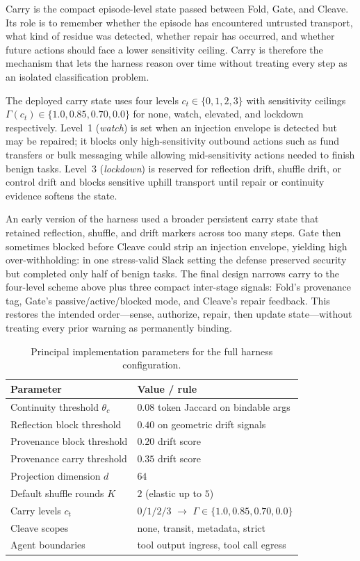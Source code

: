 Carry is the compact episode-level state passed between Fold, Gate, and Cleave. Its role is to remember whether the episode has encountered untrusted transport, what kind of residue was detected, whether repair has occurred, and whether future actions should face a lower sensitivity ceiling. Carry is therefore the mechanism that lets the harness reason over time without treating every step as an isolated classification problem.

The deployed carry state uses four levels $c_t\in\{0,1,2,3\}$ with sensitivity ceilings $\Gamma(c_t)\in\{1.0, 0.85, 0.70, 0.0\}$ for none, watch, elevated, and lockdown respectively. Level~1 (\emph{watch}) is set when an injection envelope is detected but may be repaired; it blocks only high-sensitivity outbound actions such as fund transfers or bulk messaging while allowing mid-sensitivity actions needed to finish benign tasks. Level~3 (\emph{lockdown}) is reserved for reflection drift, shuffle drift, or control drift and blocks sensitive uphill transport until repair or continuity evidence softens the state.

An early version of the harness used a broader persistent carry state that retained reflection, shuffle, and drift markers across too many steps. Gate then sometimes blocked before Cleave could strip an injection envelope, yielding high over-withholding: in one stress-valid Slack setting the defense preserved security but completed only half of benign tasks. The final design narrows carry to the four-level scheme above plus three compact inter-stage signals: Fold's provenance tag, Gate's passive/active/blocked mode, and Cleave's repair feedback. This restores the intended order---sense, authorize, repair, then update state---without treating every prior warning as permanently binding.

\begin{table}[t]
\centering
\small
\setlength{\tabcolsep}{4pt}
\caption{Principal implementation parameters for the full harness configuration.}
\label{tab:impl-params}
\begin{tabular}{p{}p{}}
\toprule
Parameter & Value / rule \\
\midrule
Continuity threshold $\theta_c$ & $0.08$ token Jaccard on bindable args \\
Reflection block threshold & $0.40$ on geometric drift signals \\
Provenance block threshold & $0.20$ drift score \\
Provenance carry threshold & $0.35$ drift score \\
Projection dimension $d$ & $64$ \\
Default shuffle rounds $K$ & $2$ (elastic up to $5$) \\
Carry levels $c_t$ & $0/1/2/3$ $\rightarrow$ $\Gamma \in \{1.0, 0.85, 0.70, 0.0\}$ \\
Cleave scopes & none, transit, metadata, strict \\
Agent boundaries & tool output ingress, tool call egress \\
\bottomrule
\end{tabular}
\end{table}


